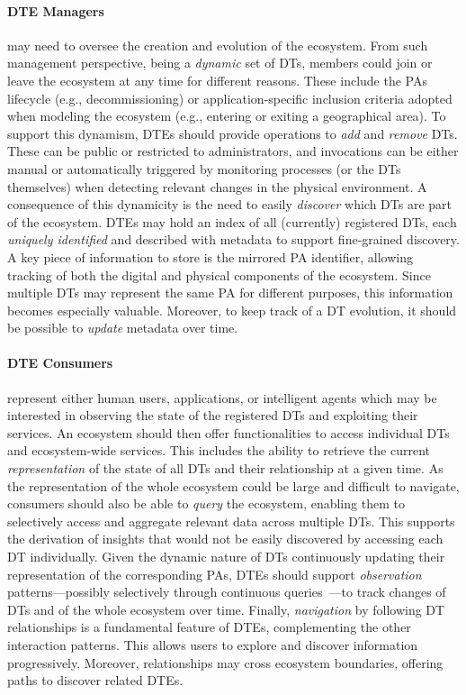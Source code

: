 \paragraph{\ac{DTE} Managers} may need to oversee the creation and evolution of the ecosystem. 
%
From such management perspective, 
being a \emph{dynamic} set of \acp{DT}, members could join or leave the ecosystem at any time for different reasons.
These include the \acp{PA} lifecycle (e.g., decommissioning) or application-specific inclusion criteria adopted when modeling the ecosystem (e.g., entering or exiting a geographical area).
%
To support this dynamism, \acp{DTE} should provide operations to \emph{add} and \emph{remove} \acp{DT}.
These can be public or restricted to administrators, and invocations can be either manual or automatically triggered by monitoring processes (or the \acp{DT} themselves) when detecting relevant changes in the physical environment.
%
A consequence of this dynamicity is the need to easily \emph{discover} which \acp{DT} are part of the ecosystem.
\acp{DTE} may hold an index of all (currently) registered \acp{DT}, each \emph{uniquely identified} and described with metadata to support fine-grained discovery.
%
A key piece of information to store is the mirrored \ac{PA} identifier, allowing tracking of both the digital and physical components of the ecosystem.
Since multiple \acp{DT} may represent the same \ac{PA} for different purposes, this information becomes especially valuable.
Moreover, to keep track of a \ac{DT} evolution, it should be possible to \emph{update} metadata over time.


\paragraph{\ac{DTE} Consumers} represent either human users, applications, or intelligent agents which may be interested in observing the state of the registered \acp{DT} and exploiting their services.
%
An ecosystem should then offer functionalities to access individual \acp{DT} and ecosystem-wide services.
This includes the ability to retrieve the current \emph{representation} of the state of all \acp{DT} and their relationship at a given time.
%
As the representation of the whole ecosystem could be large and difficult to navigate, consumers should also be able to \emph{query} the ecosystem, enabling them to selectively access and aggregate relevant data across multiple \acp{DT}.
%
This supports the derivation of insights that would not be easily discovered by accessing each \ac{DT} individually.
%
Given the dynamic nature of \acp{DT} continuously updating their representation of the corresponding \acp{PA}, \acp{DTE} should support \emph{observation} patterns---possibly selectively through continuous queries~\cite{babu2001sigmod}---to track changes of \acp{DT} and of the whole ecosystem over time.
Finally, \emph{navigation} by following \ac{DT} relationships is a fundamental feature of \acp{DTE}, complementing the other interaction patterns.
%
This allows users to explore and discover information progressively.
Moreover, relationships may cross ecosystem boundaries, offering paths to discover related \acp{DTE}.

